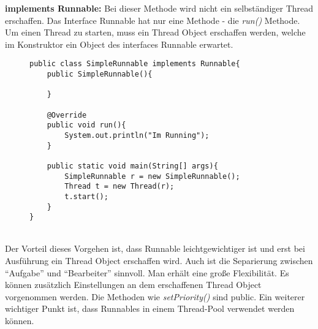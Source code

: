 \smallskip
\newline
\textbf{implements Runnable:} Bei dieser Methode wird nicht ein selbständiger Thread erschaffen. Das Interface Runnable hat nur eine Methode - die \textit{run()} Methode.\cite{Java:Runnable} Um einen Thread zu starten, muss ein Thread Object erschaffen werden, welche im Konstruktor ein Object des interfaces Runnable erwartet.
\begin{figure}[h]
\begin{lstlisting}
public class SimpleRunnable implements Runnable{
    public SimpleRunnable(){

    }

    @Override
    public void run(){
        System.out.println("Im Running");
    }

    public static void main(String[] args){
        SimpleRunnable r = new SimpleRunnable();
        Thread t = new Thread(r);
        t.start();
    }
}
\end{lstlisting}
\end{figure}
\\Der Vorteil dieses Vorgehen ist, dass Runnable leichtgewichtiger ist und erst bei Ausführung ein Thread Object erschaffen wird. Auch ist die Separierung zwischen ``Aufgabe'' und ``Bearbeiter'' sinnvoll. Man erhält eine große Flexibilität. Es können zusätzlich Einstellungen an dem erschaffenen Thread Object vorgenommen werden. Die Methoden wie \textit{setPriority()} sind public.\cite{Java:Thread} Ein weiterer wichtiger Punkt ist, dass Runnables in einem Thread-Pool verwendet werden können.

